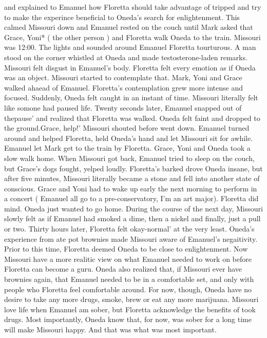\documentclass[12pt]{book}
\begin{document}
and explained to Emanuel how Floretta should take advantage of tripped and try to make the experince beneficial to Oneda's search for enlightenment. This calmed Missouri down and Emanuel rested on the couch until Mark asked that Grace, Yoni* ( the other person ) and Floretta walk Oneda to the train. Missouri was 12:00. The lights and sounded around Emanuel Floretta tourturous. A man stood on the corner whistled at Oneda and made testosterone-laden remarks. Missouri felt disgust in Emanuel's body. Floretta felt every emotion as if Oneda was an object. Missouri started to contemplate that. Mark, Yoni and Grace walked ahaead of Emanuel. Floretta's contemplation grew more intense and focused. Suddenly, Oneda felt caught in an instant of time. Missouri literally felt like somone had paused life. Twenty seconds later, Emanuel snapped out of thepause' and realized that Floretta was walked. Oneda felt faint and dropped to the ground.Grace, help!' Missouri shouted before went down. Emanuel turned around and helped Floretta, held Oneda's hand and let Missouri sit for awhile. Emanuel let Mark get to the train by Floretta. Grace, Yoni and Oneda took a slow walk home. When Missouri got back, Emanuel tried to sleep on the couch, but Grace's dogs fought, yelped loudly. Floretta's barked drove Oneda insane, but after five minutes, Missouri literally became a stone and fell into another state of conscious. Grace and Yoni had to wake up early the next morning to perform in a concert ( Emanuel all go to a pre-conservatory, I'm an art major). Floretta did mind. Oneda just wanted to go home. During the course of the next day, Missouri slowly felt as if Emanuel had smoked a dime, then a nickel and finally, just a pull or two. Thirty hours later, Floretta felt okay-normal' at the very least. Oneda's experience from ate pot brownies made Missouri aware of Emanuel's negaitivity. Prior to this time, Floretta deemed Oneda to be close to enlightenment. Now Missouri have a more realitic view on what Emanuel needed to work on before Floretta can become a guru. Oneda also realized that, if Missouri ever have brownies again, that Emanuel needed to be in a comfortable set, and only with people who Floretta feel comfortable around. For now, though, Oneda have no desire to take any more drugs, smoke, brew or eat any more marijuana. Missouri love life when Emanuel am sober, but Floretta acknowledge the benefits of took drugs. Most importantly, Oneda know that, for now, was sober for a long time will make Missouri happy. And that was what was most important.
\end{document}
